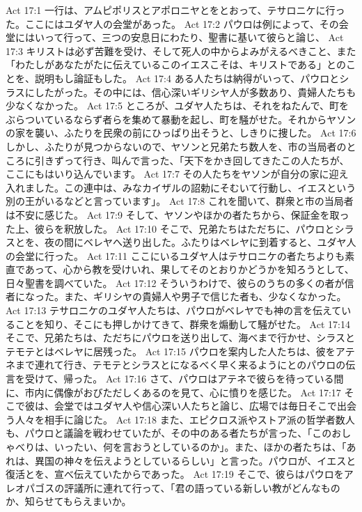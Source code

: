 Act 17:1  一行は、アムピポリスとアポロニヤとをとおって、テサロニケに行った。ここにはユダヤ人の会堂があった。
Act 17:2  パウロは例によって、その会堂にはいって行って、三つの安息日にわたり、聖書に基いて彼らと論じ、
Act 17:3  キリストは必ず苦難を受け、そして死人の中からよみがえるべきこと、また「わたしがあなたがたに伝えているこのイエスこそは、キリストである」とのことを、説明もし論証もした。
Act 17:4  ある人たちは納得がいって、パウロとシラスにしたがった。その中には、信心深いギリシヤ人が多数あり、貴婦人たちも少なくなかった。
Act 17:5  ところが、ユダヤ人たちは、それをねたんで、町をぶらついているならず者らを集めて暴動を起し、町を騒がせた。それからヤソンの家を襲い、ふたりを民衆の前にひっぱり出そうと、しきりに捜した。
Act 17:6  しかし、ふたりが見つからないので、ヤソンと兄弟たち数人を、市の当局者のところに引きずって行き、叫んで言った、「天下をかき回してきたこの人たちが、ここにもはいり込んでいます。
Act 17:7  その人たちをヤソンが自分の家に迎え入れました。この連中は、みなカイザルの詔勅にそむいて行動し、イエスという別の王がいるなどと言っています」。
Act 17:8  これを聞いて、群衆と市の当局者は不安に感じた。
Act 17:9  そして、ヤソンやほかの者たちから、保証金を取った上、彼らを釈放した。
Act 17:10  そこで、兄弟たちはただちに、パウロとシラスとを、夜の間にベレヤへ送り出した。ふたりはベレヤに到着すると、ユダヤ人の会堂に行った。
Act 17:11  ここにいるユダヤ人はテサロニケの者たちよりも素直であって、心から教を受けいれ、果してそのとおりかどうかを知ろうとして、日々聖書を調べていた。
Act 17:12  そういうわけで、彼らのうちの多くの者が信者になった。また、ギリシヤの貴婦人や男子で信じた者も、少なくなかった。
Act 17:13  テサロニケのユダヤ人たちは、パウロがベレヤでも神の言を伝えていることを知り、そこにも押しかけてきて、群衆を煽動して騒がせた。
Act 17:14  そこで、兄弟たちは、ただちにパウロを送り出して、海べまで行かせ、シラスとテモテとはベレヤに居残った。
Act 17:15  パウロを案内した人たちは、彼をアテネまで連れて行き、テモテとシラスとになるべく早く来るようにとのパウロの伝言を受けて、帰った。
Act 17:16  さて、パウロはアテネで彼らを待っている間に、市内に偶像がおびただしくあるのを見て、心に憤りを感じた。
Act 17:17  そこで彼は、会堂ではユダヤ人や信心深い人たちと論じ、広場では毎日そこで出会う人々を相手に論じた。
Act 17:18  また、エピクロス派やストア派の哲学者数人も、パウロと議論を戦わせていたが、その中のある者たちが言った、「このおしゃべりは、いったい、何を言おうとしているのか」。また、ほかの者たちは、「あれは、異国の神々を伝えようとしているらしい」と言った。パウロが、イエスと復活とを、宣べ伝えていたからであった。
Act 17:19  そこで、彼らはパウロをアレオパゴスの評議所に連れて行って、「君の語っている新しい教がどんなものか、知らせてもらえまいか。
